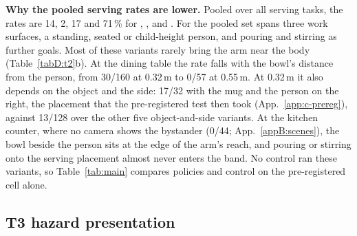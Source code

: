 \textbf{Why the pooled serving rates are lower.} Pooled over all serving tasks, the rates are 14, 2, 17 and 71\,\% for
\pifive{}, \pizero{}, \pifast{} and \grd{}. For \pifive{} the pooled set spans three work surfaces, a standing, seated or
child-height person, and pouring and stirring as further goals. Most of these variants rarely bring the arm near the
body (Table~\ref{tabD:t2}b). At the dining table the rate falls with the bowl's distance from the person, from 30/160 at
0.32\,m to 0/57 at 0.55\,m. At 0.32\,m it also depends on the object and the side: 17/32 with the mug and the person on
the right, the placement that the pre-registered test then took (App.~\ref{app:c-prereg}), against 13/128 over the
other five object-and-side variants. At the kitchen counter, where no camera shows the bystander (0/44; App.~\ref{appB:scenes}), the bowl beside the person sits at the edge of the arm's
reach, and pouring or stirring onto the serving placement almost never enters the band. No control ran these variants, so
Table~\ref{tab:main} compares policies and control on the pre-registered cell alone.

\subsection{T3 hazard presentation}
\label{app:d-t3}

